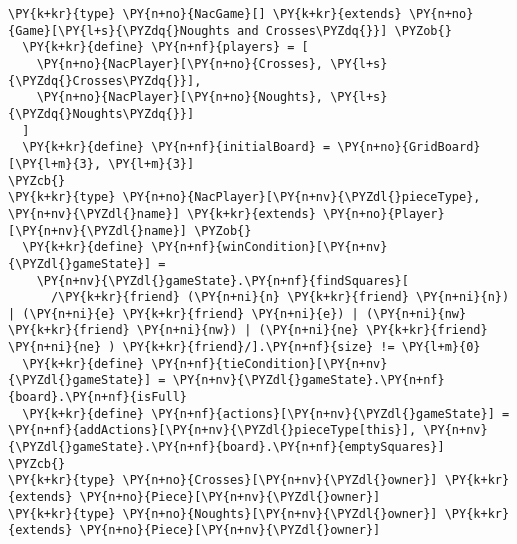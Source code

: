 \begin{Verbatim}[commandchars=\\\{\}]
\PY{k+kr}{type} \PY{n+no}{NacGame}[] \PY{k+kr}{extends} \PY{n+no}{Game}[\PY{l+s}{\PYZdq{}Noughts and Crosses\PYZdq{}}] \PYZob{}
  \PY{k+kr}{define} \PY{n+nf}{players} = [
    \PY{n+no}{NacPlayer}[\PY{n+no}{Crosses}, \PY{l+s}{\PYZdq{}Crosses\PYZdq{}}],
    \PY{n+no}{NacPlayer}[\PY{n+no}{Noughts}, \PY{l+s}{\PYZdq{}Noughts\PYZdq{}}]
  ]
  \PY{k+kr}{define} \PY{n+nf}{initialBoard} = \PY{n+no}{GridBoard}[\PY{l+m}{3}, \PY{l+m}{3}]
\PYZcb{}
\PY{k+kr}{type} \PY{n+no}{NacPlayer}[\PY{n+nv}{\PYZdl{}pieceType}, \PY{n+nv}{\PYZdl{}name}] \PY{k+kr}{extends} \PY{n+no}{Player}[\PY{n+nv}{\PYZdl{}name}] \PYZob{}
  \PY{k+kr}{define} \PY{n+nf}{winCondition}[\PY{n+nv}{\PYZdl{}gameState}] =
    \PY{n+nv}{\PYZdl{}gameState}.\PY{n+nf}{findSquares}[
      /\PY{k+kr}{friend} (\PY{n+ni}{n} \PY{k+kr}{friend} \PY{n+ni}{n}) | (\PY{n+ni}{e} \PY{k+kr}{friend} \PY{n+ni}{e}) | (\PY{n+ni}{nw} \PY{k+kr}{friend} \PY{n+ni}{nw}) | (\PY{n+ni}{ne} \PY{k+kr}{friend} \PY{n+ni}{ne} ) \PY{k+kr}{friend}/].\PY{n+nf}{size} != \PY{l+m}{0}
  \PY{k+kr}{define} \PY{n+nf}{tieCondition}[\PY{n+nv}{\PYZdl{}gameState}] = \PY{n+nv}{\PYZdl{}gameState}.\PY{n+nf}{board}.\PY{n+nf}{isFull}
  \PY{k+kr}{define} \PY{n+nf}{actions}[\PY{n+nv}{\PYZdl{}gameState}] = \PY{n+nf}{addActions}[\PY{n+nv}{\PYZdl{}pieceType[this}], \PY{n+nv}{\PYZdl{}gameState}.\PY{n+nf}{board}.\PY{n+nf}{emptySquares}]
\PYZcb{}
\PY{k+kr}{type} \PY{n+no}{Crosses}[\PY{n+nv}{\PYZdl{}owner}] \PY{k+kr}{extends} \PY{n+no}{Piece}[\PY{n+nv}{\PYZdl{}owner}]
\PY{k+kr}{type} \PY{n+no}{Noughts}[\PY{n+nv}{\PYZdl{}owner}] \PY{k+kr}{extends} \PY{n+no}{Piece}[\PY{n+nv}{\PYZdl{}owner}]
\end{Verbatim}
